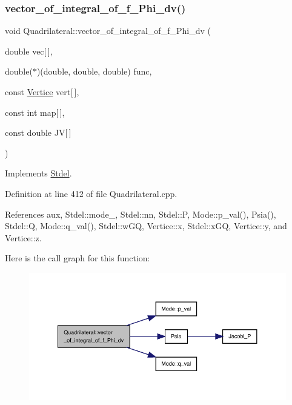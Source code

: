 \subsubsection{\texorpdfstring{vector\+\_\+of\+\_\+integral\+\_\+of\+\_\+f\+\_\+\+Phi\+\_\+dv()}{vector\_of\_integral\_of\_f\_Phi\_dv()}\hspace{0.1cm}{\footnotesize\ttfamily [2/2]}}
{\footnotesize\ttfamily void Quadrilateral\+::vector\+\_\+of\+\_\+integral\+\_\+of\+\_\+f\+\_\+\+Phi\+\_\+dv (\begin{DoxyParamCaption}\item[{double}]{vec\mbox{[}$\,$\mbox{]},  }\item[{double($\ast$)(double, double, double)}]{func,  }\item[{const \hyperlink{structVertice}{Vertice}}]{vert\mbox{[}$\,$\mbox{]},  }\item[{const int}]{map\mbox{[}$\,$\mbox{]},  }\item[{const double}]{JV\mbox{[}$\,$\mbox{]} }\end{DoxyParamCaption})\hspace{0.3cm}{\ttfamily [virtual]}}



Implements \hyperlink{classStdel_a3a22725f255ab04520ce1744eef8e2c0}{Stdel}.



Definition at line 412 of file Quadrilateral.\+cpp.



References aux, Stdel\+::mode\+\_\+, Stdel\+::nn, Stdel\+::P, Mode\+::p\+\_\+val(), Psia(), Stdel\+::Q, Mode\+::q\+\_\+val(), Stdel\+::w\+GQ, Vertice\+::x, Stdel\+::x\+GQ, Vertice\+::y, and Vertice\+::z.

Here is the call graph for this function\+:
\nopagebreak
\begin{figure}[H]
\begin{center}
\leavevmode
\includegraphics[width=350pt]{classQuadrilateral_a0ee1b169fe49cc443684dfe2eb605b17_cgraph}
\end{center}
\end{figure}
\mbox{\label{classStdel_a395c8d7d7890a9efdea23932fa22b420}} 

